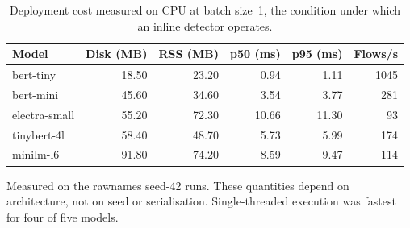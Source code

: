 \begin{table}[htbp]
\centering
\caption{Deployment cost measured on CPU at batch size~1, the condition under which an inline detector operates.}
\label{tab:resources}
\small
\begin{tabular}{lrrrrr}
\toprule
Model & Disk (MB) & RSS (MB) & p50 (ms) & p95 (ms) & Flows/s \\
\midrule
bert-tiny & 18.50 & 23.20 & 0.94 & 1.11 & 1045 \\
bert-mini & 45.60 & 34.60 & 3.54 & 3.77 & 281 \\
electra-small & 55.20 & 72.30 & 10.66 & 11.30 & 93 \\
tinybert-4l & 58.40 & 48.70 & 5.73 & 5.99 & 174 \\
minilm-l6 & 91.80 & 74.20 & 8.59 & 9.47 & 114 \\
\bottomrule
\end{tabular}
\vspace{2pt}
\footnotesize Measured on the rawnames seed-42 runs. These quantities depend on architecture, not on seed or serialisation. Single-threaded execution was fastest for four of five models.
\end{table}

